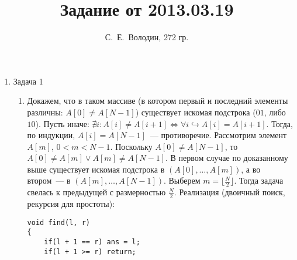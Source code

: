 \documentclass[a4paper]{article}
\title{Задание от 2013.03.19}
\author{С.~Е.~Володин, 272 гр.}
\date{}
\begin{document}
\maketitle
\begin{enumerate} 
\item Задача 1
\begin{enumerate}
\item Докажем, что в таком массиве (в котором первый и последний элементы различны: $A[0]\neq A[N-1]$) существует искомая подстрока ($01$, либо $10$). Пусть иначе: $\nexists i:A[i]\neq A[i+1]\Leftrightarrow\forall i\hookrightarrow A[i]=A[i+1]$. Тогда, по индукции, $A[i]=A[N-1]$~--- противоречие.\newline
Рассмотрим элемент $A[m]$, $0<m<N-1$. Поскольку $A[0]\neq A[N-1]$, то $A[0]\neq A[m] \vee A[m] \neq A[N-1]$. В первом случае по доказанному выше существует искомая подстрока в $(A[0],\dots,A[m])$, а во втором~--- в $(A[m],\dots,A[N-1])$. Выберем $m=\lfloor\frac{N}{2}\rfloor$. Тогда задача свелась к предыдущей с размерностью $\frac{N}{2}$.\newline
Реализация (двоичный поиск, рекурсия для простоты):\begin{verbatim}void find(l, r)
{
    if(l + 1 == r) ans = l;
    if(l + 1 >= r) return;


\end{verbatim}
\end{enumerate}
\end{enumerate}
\end{document}
